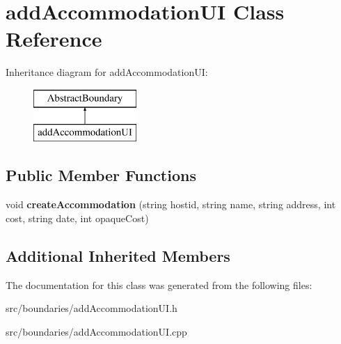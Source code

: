 \hypertarget{classadd_accommodation_u_i}{}\section{add\+Accommodation\+UI Class Reference}
\label{classadd_accommodation_u_i}
Inheritance diagram for add\+Accommodation\+UI\+:\begin{figure}[H]
\begin{center}
\leavevmode
\includegraphics[height=2.000000cm]{classadd_accommodation_u_i}
\end{center}
\end{figure}
\subsection*{Public Member Functions}
\begin{DoxyCompactItemize}
\item 
\mbox{\label{classadd_accommodation_u_i_aade79d966092990c38b6c23e447e2307}} 
void {\bfseries create\+Accommodation} (string hostid, string name, string address, int cost, string date, int opaque\+Cost)
\end{DoxyCompactItemize}
\subsection*{Additional Inherited Members}


The documentation for this class was generated from the following files\+:\begin{DoxyCompactItemize}
\item 
src/boundaries/add\+Accommodation\+U\+I.\+h\item 
src/boundaries/add\+Accommodation\+U\+I.\+cpp\end{DoxyCompactItemize}
